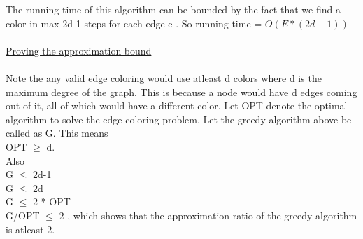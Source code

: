 \documentclass[11pt]{article}
\begin{document}
The running time of this algorithm can be bounded by the fact that we find a color in max 2d-1 steps for each edge e .
So running time = $O( E * (2d-1) )$\\\\
\underline{Proving the approximation bound}\\\\
Note the any valid edge coloring would use atleast d colors where d is the maximum degree of the graph. This is because a node would have d edges coming out of it, all of which would have a different color. Let OPT denote the optimal algorithm to solve the edge coloring problem. Let the greedy algorithm above be called as G. This means \\ 
OPT $\geq$ d. \\
Also \\
G $\leq$ 2d-1\\
G $\leq$ 2d\\
G $\leq$ 2 * OPT \\
G/OPT $\leq$ 2 , which shows that the approximation ratio of the greedy algorithm is atleast 2.
\end{document}
